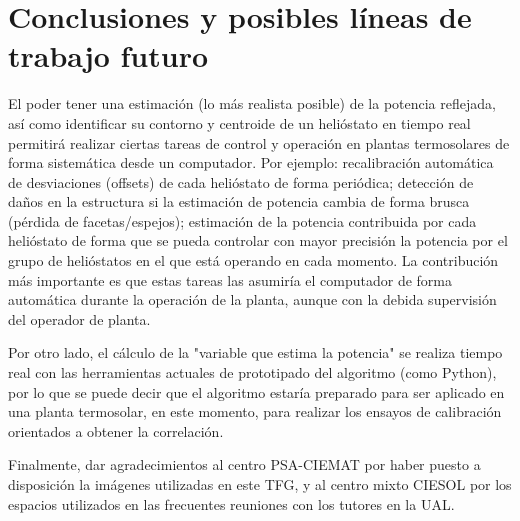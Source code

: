 \chapter{Conclusiones y posibles líneas de trabajo futuro}
 
El poder tener una estimación (lo más realista posible) de la potencia reflejada, así como identificar su contorno y centroide de un helióstato en tiempo real permitirá realizar ciertas tareas de control y operación en plantas termosolares de forma sistemática desde un computador. Por ejemplo: recalibración automática de desviaciones (offsets) de cada helióstato de forma periódica; detección de daños en la estructura si la estimación de potencia cambia de forma brusca (pérdida de facetas/espejos); estimación de la potencia contribuida por cada helióstato de forma que se pueda controlar con mayor precisión la potencia por el grupo de helióstatos en el que está operando en cada momento. La contribución más importante es que estas tareas las asumiría el computador de forma automática durante la operación de la planta, aunque con la debida supervisión del operador de planta.

Por otro lado, el cálculo de la "variable que estima la potencia" se realiza tiempo real con las herramientas actuales de prototipado del algoritmo (como Python), por lo que se puede decir que el algoritmo estaría preparado para ser aplicado en una planta termosolar, en este momento, para realizar los ensayos de calibración orientados a obtener la correlación.

Finalmente, dar agradecimientos al centro PSA-CIEMAT por haber puesto a disposición la imágenes utilizadas en este TFG, y al centro mixto CIESOL por los espacios utilizados en las frecuentes reuniones con los tutores en la UAL.